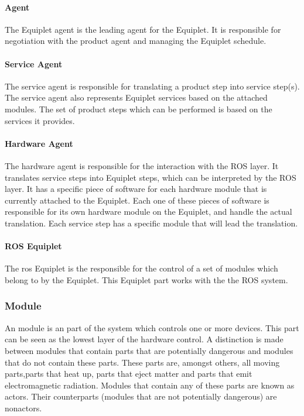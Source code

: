 \documentclass[12pt,a4paper]{report}
\begin{document}
\paragraph{Agent}
The Equiplet agent is the leading agent for the Equiplet. It is responsible for negotiation with the product agent and managing the Equiplet schedule.\cite{REXOS_Design}
\paragraph{Service Agent}
The service agent is responsible for translating a product step into service step(s). The service agent also represents Equiplet services based on the attached modules. The set of product steps which can be performed is based on the services it provides.\cite{REXOS_Design}
\paragraph{Hardware Agent}
The hardware agent is responsible for the interaction with the ROS layer. It translates service steps into Equiplet steps, which can be interpreted by the ROS layer. It has a specific piece of software for each hardware module that is currently attached to the Equiplet. Each one of these pieces of software is responsible for its own hardware module on the Equiplet, and handle the actual translation. Each service step has a specific module that will lead the translation. \cite{REXOS_Design}
\paragraph{ROS Equiplet}
The ros Equiplet is the responsible for the control of a set of modules which belong to by the Equiplet. This Equiplet part works with the the ROS system.

\subsubsection{Module}
An module is an part of the system which controls one or more devices. This part can be seen as the lowest layer of the hardware control. A distinction is made between modules that contain parts that are potentially dangerous and modules that do not contain these parts. These parts are, amongst others, all moving parts,parts that heat up, parts that eject matter and parts that emit electromagnetic radiation. Modules that contain any of these parts are known as actors. Their counterparts (modules that are not potentially dangerous) are nonactors.\cite{mast_funcional_design}
\end{document}
